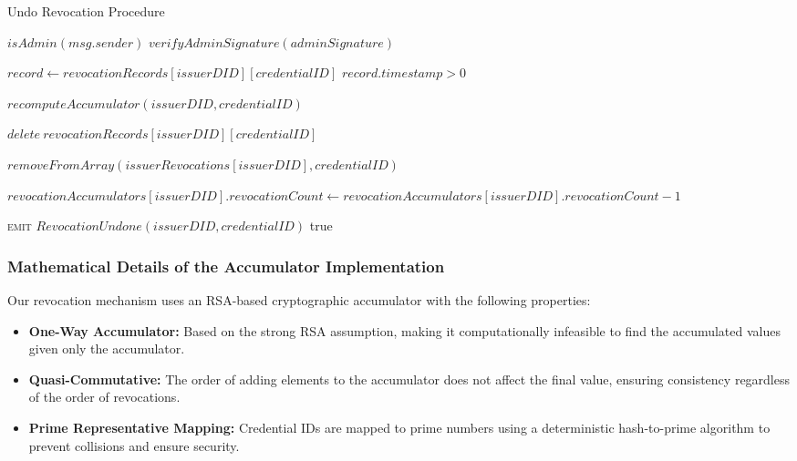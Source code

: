 \documentclass[lettersize,journal]{IEEEtran}
\begin{document}
\begin{algorithm}
\caption{Undo Revocation Procedure}
\begin{algorithmic}[1]
    \Require $isAdmin(msg.sender)$ 
    \Require $verifyAdminSignature(adminSignature)$ 
    
    \State $record \gets revocationRecords[issuerDID][credentialID]$
    \Require $record.timestamp > 0$ 
    
    \State $recomputeAccumulator(issuerDID, credentialID)$
    
    \State $delete\ revocationRecords[issuerDID][credentialID]$
    
    \State $removeFromArray(issuerRevocations[issuerDID], credentialID)$
    
    \State $revocationAccumulators[issuerDID].revocationCount \gets revocationAccumulators[issuerDID].revocationCount - 1$
    
    \State \textsc{emit} $RevocationUndone(issuerDID, credentialID)$
    \RETURN true
\EndProcedure
\end{algorithmic}
\end{algorithm}

\subsubsection{Mathematical Details of the Accumulator Implementation}

Our revocation mechanism uses an RSA-based cryptographic accumulator with the following properties:

\begin{itemize}
    \item \textbf{One-Way Accumulator:} Based on the strong RSA assumption, making it computationally infeasible to find the accumulated values given only the accumulator.
    
    \item \textbf{Quasi-Commutative:} The order of adding elements to the accumulator does not affect the final value, ensuring consistency regardless of the order of revocations.
    
    \item \textbf{Prime Representative Mapping:} Credential IDs are mapped to prime numbers using a deterministic hash-to-prime algorithm to prevent collisions and ensure security.
\end{itemize}
\end{document}
